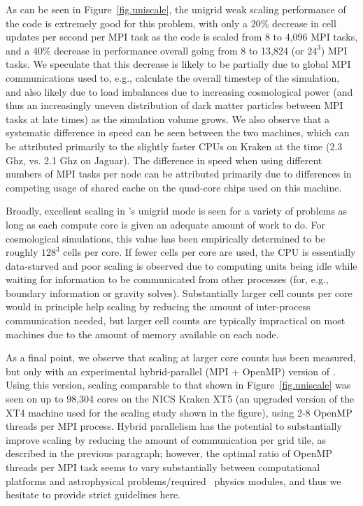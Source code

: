 As can be seen in Figure~\ref{fig.uniscale}, the unigrid weak scaling
performance of the code is extremely good for this problem, with only
a 20\% decrease in cell updates per second per MPI task as the code is scaled from
8 to 4,096 MPI tasks, and a 40\% decrease in performance overall going
from 8 to 13,824 (or $24^3$) MPI tasks.  We speculate that this
decrease is likely to be partially due to global MPI communications
used to, e.g., calculate the overall timestep of the simulation, and
also likely due to load imbalances due to increasing cosmological
power (and thus an increasingly uneven distribution of dark matter
particles between MPI tasks at late times) as the simulation volume
grows.  We also observe that a systematic difference in speed can be
seen between the two machines, which can be attributed primarily to
the slightly faster CPUs on Kraken at the time (2.3 Ghz, vs. 2.1 Ghz
on Jaguar).  The difference in speed when using different numbers of
MPI tasks per node can be attributed primarily due to differences in
competing usage of shared cache on the quad-core chips used on this
machine.

Broadly, excellent scaling in \enzo's unigrid mode is seen for a
variety of problems as long as each compute core is given an adequate
amount of work to do.  For cosmological simulations, this value has
been empirically determined to be roughly $128^3$ cells per core.  If
fewer cells per core are used, the CPU is essentially data-starved 
and poor scaling is observed due to computing units being idle while
waiting for information to be communicated from other processes (for,
e.g., boundary information or gravity solves).  Substantially larger
cell counts per core would in principle help scaling by reducing the
amount of inter-process communication needed, but larger cell counts
are typically impractical on most machines due to the amount of memory
available on each node.

As a final point, we observe that scaling at larger core counts has
been measured, but only with an experimental hybrid-parallel (MPI +
OpenMP) version of \enzo.  Using this version, scaling comparable to
that shown in Figure~\ref{fig.uniscale} was seen on up to 98,304 cores
on the NICS Kraken XT5 (an upgraded version of the XT4 machine used
for the scaling study shown in the figure), using 2-8 OpenMP threads
per MPI process.  Hybrid parallelism has the potential to
substantially improve scaling by reducing the amount of communication
per grid tile, as described in the previous paragraph; however, the
optimal ratio of OpenMP threads per MPI task seems to vary
substantially between computational platforms and astrophysical
problems/required \enzo\ physics modules, and thus we hesitate to
provide strict guidelines here.

